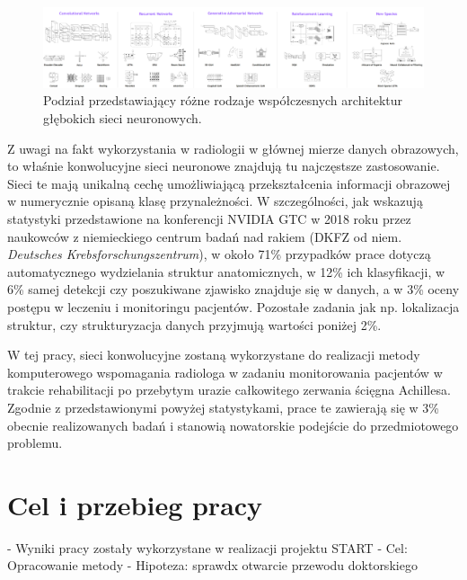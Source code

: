 \begin{figure}[h!]
	\centering
	\includegraphics[width=1.0\textwidth]{figures/rodzajeSieciNeuronowych.png}
	\caption{Podział przedstawiający różne rodzaje współczesnych architektur głębokich sieci neuronowych.}
	\label{DLcambrianExplosion}
\end{figure}

Z uwagi na fakt wykorzystania w radiologii w głównej mierze danych obrazowych, to właśnie konwolucyjne sieci neuronowe znajdują tu najczęstsze zastosowanie. Sieci te mają unikalną cechę umożliwiającą przekształcenia informacji obrazowej w numerycznie opisaną klasę przynależności. W szczególności, jak wskazują statystyki przedstawione na konferencji NVIDIA GTC w 2018 roku przez naukowców z niemieckiego centrum badań nad rakiem (DKFZ od niem. \textit{Deutsches Krebsforschungszentrum}), w około 71\% przypadków prace dotyczą automatycznego wydzielania struktur anatomicznych, w 12\% ich klasyfikacji, w 6\% samej detekcji czy poszukiwane zjawisko znajduje się w danych, a w 3\% oceny postępu w leczeniu i monitoringu pacjentów. Pozostałe zadania jak np. lokalizacja struktur, czy strukturyzacja danych przyjmują wartości poniżej 2\%.

W tej pracy, sieci konwolucyjne zostaną wykorzystane do realizacji metody komputerowego wspomagania radiologa w zadaniu monitorowania pacjentów w trakcie rehabilitacji po przebytym urazie całkowitego zerwania ścięgna Achillesa. Zgodnie z przedstawionymi powyżej statystykami, prace te zawierają się w 3\% obecnie realizowanych badań i stanowią nowatorskie podejście do przedmiotowego problemu.


\chapter{Cel i przebieg pracy}

- Wyniki pracy zostały wykorzystane w realizacji projektu START
- Cel: Opracowanie metody 
- Hipoteza: sprawdx otwarcie przewodu doktorskiego 
